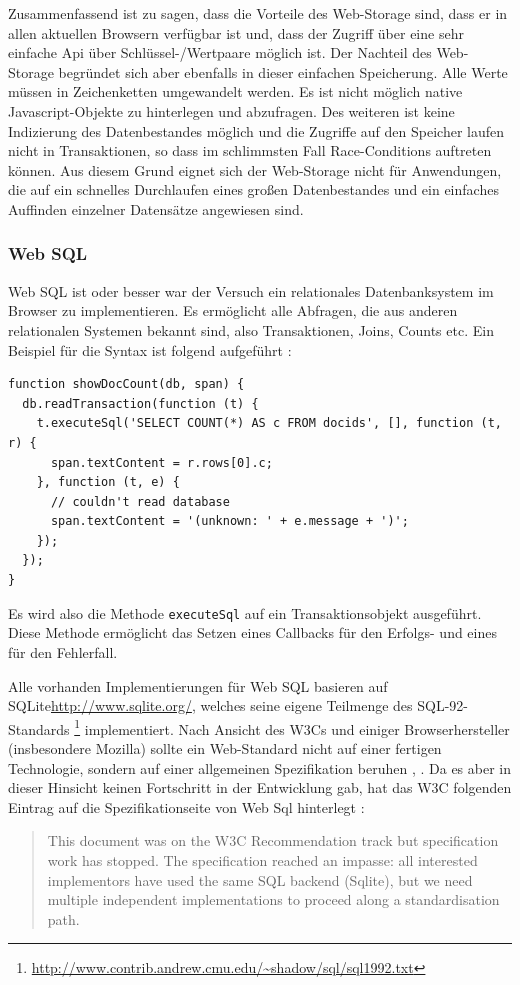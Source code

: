 Zusammenfassend ist zu sagen, dass die Vorteile des Web-Storage sind, dass er in allen aktuellen Browsern verfügbar ist und, dass der Zugriff über eine sehr einfache Api über Schlüssel-/Wertpaare möglich ist. Der Nachteil des Web-Storage begründet sich aber ebenfalls in dieser einfachen Speicherung. Alle Werte müssen in Zeichenketten umgewandelt werden. Es ist nicht möglich native Javascript-Objekte zu hinterlegen und abzufragen. Des weiteren ist keine Indizierung des Datenbestandes möglich und die Zugriffe auf den Speicher laufen nicht in Transaktionen, so dass im schlimmsten Fall Race-Conditions auftreten können. Aus diesem Grund eignet sich der Web-Storage nicht für Anwendungen, die auf ein schnelles Durchlaufen eines großen Datenbestandes und ein einfaches Auffinden einzelner Datensätze angewiesen sind.

\subsubsection{Web SQL}
Web SQL ist oder besser war der Versuch ein relationales Datenbanksystem im Browser zu implementieren. Es ermöglicht alle Abfragen, die aus anderen relationalen Systemen bekannt sind, also Transaktionen, Joins, Counts etc. Ein Beispiel für die Syntax ist folgend aufgeführt \cite{W3C2010}:

\begin{lstlisting}
function showDocCount(db, span) {
  db.readTransaction(function (t) {
    t.executeSql('SELECT COUNT(*) AS c FROM docids', [], function (t, r) {
      span.textContent = r.rows[0].c;
    }, function (t, e) {
      // couldn't read database
      span.textContent = '(unknown: ' + e.message + ')';
    });
  });
}
\end{lstlisting}
Es wird also die Methode \texttt{executeSql} auf ein Transaktionsobjekt ausgeführt. Diese Methode ermöglicht das Setzen eines Callbacks für den Erfolgs- und eines für den Fehlerfall. 

Alle vorhanden Implementierungen für Web SQL basieren auf SQLite{\url{http://www.sqlite.org/}}, welches seine eigene Teilmenge des SQL-92-Standards \footnote{\url{http://www.contrib.andrew.cmu.edu/~shadow/sql/sql1992.txt}} implementiert. Nach Ansicht des W3Cs und einiger Browserhersteller (insbesondere Mozilla) sollte ein Web-Standard nicht auf einer fertigen Technologie, sondern auf einer allgemeinen Spezifikation beruhen \cite{W3C2010}, \cite{Ranganathan2010}. Da es aber in dieser Hinsicht keinen Fortschritt in der Entwicklung gab, hat das W3C folgenden Eintrag auf die Spezifikationseite von Web Sql hinterlegt :
\begin{quotation}
 This document was on the W3C Recommendation track but specification work has stopped. The specification reached an impasse: all interested implementors have used the same SQL backend (Sqlite), but we need multiple independent implementations to proceed along a standardisation path.
\end{quotation} \cite{W3C2010}

